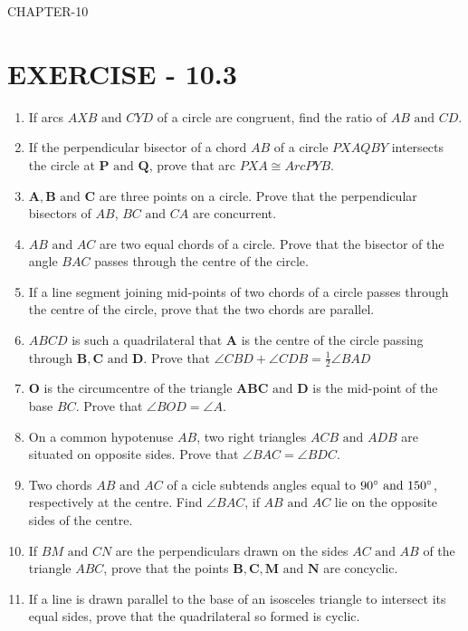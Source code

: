 \documentclass[12pt]{article}
\let\vec\mathbf
\begin{document}
\begin{center}
\textbf\large{CHAPTER-10}
\end{center}

\section{EXERCISE - 10.3}
\begin{enumerate}
\item If arcs ${AXB}\text{ and }{CYD}$ of a circle are congruent, find the ratio of ${AB}\text{ and }{CD}$.
\item If the perpendicular bisector of a chord ${AB}$ of a circle ${PXAQBY}$ intersects the circle at $\vec{P}\text{ and }\vec{Q}$, prove that arc ${PXA}\cong Arc {PYB}$.
\item $\vec{A},\vec{B}\text{ and }\vec{C}$ are three points on a circle. Prove that the perpendicular bisectors of ${AB}$, ${BC}\text{ and }{CA}$ are concurrent.
\item ${AB}\text{ and }{AC}$ are two equal chords of a circle. Prove that the bisector of the angle ${BAC}$ passes through the centre of the circle.
\item If a line segment joining mid-points of two chords of a circle passes through the centre of the circle, prove that the two chords are parallel.
\item ${ABCD}$ is such a quadrilateral that $\vec{A}$ is the centre of the circle passing through $\vec{B},\vec{C}\text{ and }\vec{D}$. Prove that $\angle CBD+ \angle CDB = \frac{1}{2} \angle BAD$
\item $\vec{O}$ is the circumcentre of the triangle $\vec{ABC}\text{ and }\vec{D}$ is the mid-point of the base ${BC}$. Prove that $\angle BOD = \angle A$.
\item On a common hypotenuse ${AB}$, two right triangles ${ACB}\text{ and }{ADB}$ are situated on opposite sides. Prove that $\angle BAC = \angle BDC$.
\item Two chords ${AB}\text{ and }{AC}$ of a cicle subtends angles equal to $90\degree \text{ and }150\degree$, respectively at the centre. Find $\angle BAC$, if ${AB}\text{ and }{AC}$ lie on the opposite sides of the centre.
\item If ${BM}\text{ and }{CN}$ are the perpendiculars drawn on the sides ${AC}\text{ and }{AB}$ of the triangle ${ABC}$, prove that the points $\vec{B},\vec{C},\vec{M}\text{ and }\vec{N}$ are concyclic.
\item If a line is drawn parallel to the base of an isosceles triangle to intersect its equal sides, prove that the quadrilateral so formed is cyclic.

\end{enumerate}
\end{document}
